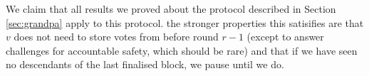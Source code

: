 \documentclass{article}
\begin{document}
 We claim that all results we proved about the protocol described in Section \ref{sec:grandpa} apply to this protocol. the stronger properties this satisifies are that $v$ does not need to store votes from before round $r-1$ (except to answer challenges for accountable safety, which should be rare) and that if we have seen no descendants of the last finalised block, we pause until we do. 



\end{document}
